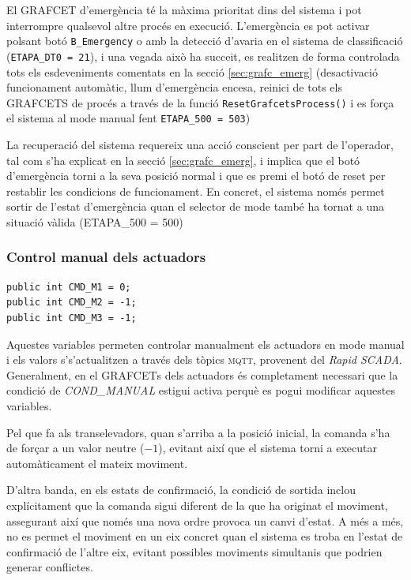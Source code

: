 \documentclass[a4paper,11pt,DIV=13,headings=normal,abstract=true,twoside=semi]{article}
\newcommand{\acro}[1]{\textsc{#1}}
\begin{document}
El \acro{GRAFCET} d'emergència té la màxima prioritat dins del sistema i pot interrompre qualsevol altre procés en execució. L'emergència es pot activar polsant botó \texttt{B\_Emergency} o amb la detecció d'avaria en el sistema de classificació (\texttt{ETAPA\_DT0 = 21}), i una vegada això ha succeit,  es realitzen de forma controlada tots els esdeveniments comentats en la secció \ref{sec:grafc_emerg} (desactivació funcionament automàtic, llum d'emergència encesa, reinici de tots els \acro{GRAFCET}S de procés a través de la funció \texttt{ResetGrafcetsProcess()} i es força el sistema al mode manual fent \texttt{ETAPA\_500 = 503})

La recuperació del sistema requereix una acció conscient per part de l'operador, tal com s'ha explicat en la secció \ref{sec:grafc_emerg}, i implica que el botó d'emergència torni a la seva posició normal i que es premi el botó de reset per restablir les condicions de funcionament. En concret, el sistema només permet sortir de l'estat d'emergència quan el selector de mode també ha tornat a una situació vàlida (ETAPA\_500 = 500)


\subsubsection*{Control manual dels actuadors}

\begin{lstlisting}[style=simple]
public int CMD_M1 = 0;
public int CMD_M2 = -1;
public int CMD_M3 = -1;
\end{lstlisting}

Aquestes variables permeten controlar manualment els actuadors en mode manual i els valors s's'actualitzen a través dels tòpics \acro{mqtt}, provenent del \emph{Rapid SCADA}. Generalment, en el \acro{GRAFCET}s dels actuadors és completament necessari que la condició de \emph{COND\_MANUAL} estigui activa perquè es pogui modificar aquestes variables.

Pel que fa als transelevadors, quan s'arriba a la posició inicial, la comanda s'ha de forçar a un valor neutre (\texttt{$-1$}), evitant així que el sistema torni a executar automàticament el mateix moviment.

D'altra banda, en els estats de confirmació, la condició de sortida inclou explícitament que la comanda sigui diferent de la que ha originat el moviment, assegurant així que només una nova ordre provoca un canvi d'estat. A més a més, no es permet el moviment en un eix concret quan el sistema es troba en l'estat de confirmació de l'altre eix, evitant possibles moviments simultanis que podrien generar conflictes.
\end{document}
